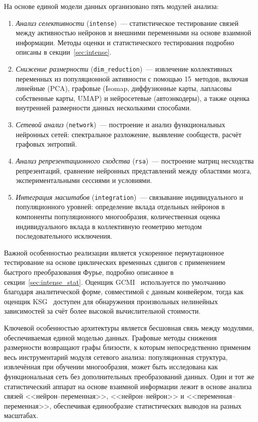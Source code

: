 
На основе единой модели данных организовано пять модулей анализа:

\begin{enumerate}
    \item \textit{Анализ селективности} (\texttt{intense})~--- статистическое тестирование связей между активностью нейронов и внешними переменными на основе взаимной информации. Методы оценки и статистического тестирования подробно описаны в секции~\ref{sec:intense}.
    \item \textit{Снижение размерности} (\texttt{dim\_reduction})~--- извлечение коллективных переменных из популяционной активности с помощью 15~методов, включая линейные (PCA), графовые (Isomap, диффузионные карты, лапласовы собственные карты, UMAP) и нейросетевые (автоэнкодеры), а также оценка внутренней размерности данных несколькими способами.
    \item \textit{Сетевой анализ} (\texttt{network})~--- построение и анализ функциональных нейронных сетей: спектральное разложение, выявление сообществ, расчёт графовых энтропий.
    \item \textit{Анализ репрезентационного сходства} (\texttt{rsa})~--- построение матриц несходства репрезентаций, сравнение нейронных представлений между областями мозга, экспериментальными сессиями и условиями.
    \item \textit{Интеграция масштабов} (\texttt{integration})~--- связывание индивидуального и популяционного уровней: определение вклада отдельных нейронов в компоненты популяционного многообразия, количественная оценка индивидуального вклада в коллективную геометрию методом последовательного исключения.
\end{enumerate}

Важной особенностью реализации является ускоренное пермутационное тестирование на основе циклических временных сдвигов с применением быстрого преобразования Фурье, подробно описанное в секции~\ref{sec:intense_stat}. Оценщик GCMI~\cite{Ince2017} используется по умолчанию благодаря аналитической форме, совместимой с данным конвейером, тогда как оценщик KSG~\cite{Kraskov2004} доступен для обнаружения произвольных нелинейных зависимостей за счёт более высокой вычислительной стоимости.

Ключевой особенностью архитектуры является бесшовная связь между модулями, обеспечиваемая единой моделью данных. Графовые методы снижения размерности возвращают графы близости, к которым непосредственно применим весь инструментарий модуля сетевого анализа: популяционная структура, извлечённая при обучении многообразия, может быть исследована как функциональная сеть без дополнительных преобразований данных. Один и тот же статистический аппарат на основе взаимной информации лежит в основе анализа связей <<нейрон--переменная>>, <<нейрон--нейрон>> и <<переменная--переменная>>, обеспечивая единообразие статистических выводов на разных масштабах.

